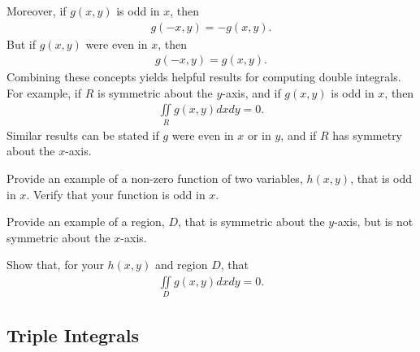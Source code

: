 Moreover, if $g(x,y)$ is odd in $x$, then 
\begin{align*}
  g(-x,y) = - g(x,y).
\end{align*}
But if $g(x,y)$ were even in $x$, then 
\begin{align*}
  g(-x,y) =  g(x,y).
\end{align*}
Combining these concepts yields helpful results for computing double integrals. For example, if $R$ is symmetric about the $y$-axis, and if $g(x,y)$ is odd in $x$, then
\begin{align*}
  \iint\limits_R g(x,y) dxdy = 0.
\end{align*}
Similar results can be stated if $g$ were even in $x$ or in $y$, and if $R$ has symmetry about the $x$-axis. 
\BEN
\item Provide an example of a non-zero function of two variables, $h(x,y)$, that is odd in $x$. Verify that your function is odd in $x$.
\item Provide an example of a region, $D$, that is symmetric about the $y$-axis, but is not symmetric about the $x$-axis. 
\item Show that, for your $h(x,y)$ and region $D$, that 
\begin{align*}
  \iint\limits_D g(x,y) dxdy = 0.
\end{align*}
\EEN

\EEN %

\subsection{Triple Integrals}
  
